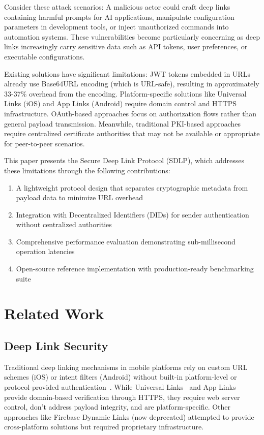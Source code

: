 \documentclass[conference]{IEEEtran}
\begin{document}
Consider these attack scenarios: A malicious actor could craft deep links containing harmful prompts for AI applications, manipulate configuration parameters in development tools, or inject unauthorized commands into automation systems. These vulnerabilities become particularly concerning as deep links increasingly carry sensitive data such as API tokens, user preferences, or executable configurations.

Existing solutions have significant limitations: JWT tokens embedded in URLs already use Base64URL encoding (which is URL-safe), resulting in approximately 33-37\% overhead from the encoding. Platform-specific solutions like Universal Links (iOS) and App Links (Android) require domain control and HTTPS infrastructure. OAuth-based approaches focus on authorization flows rather than general payload transmission. Meanwhile, traditional PKI-based approaches require centralized certificate authorities that may not be available or appropriate for peer-to-peer scenarios.

This paper presents the Secure Deep Link Protocol (SDLP), which addresses these limitations through the following contributions:

\begin{enumerate}
    \item A lightweight protocol design that separates cryptographic metadata from payload data to minimize URL overhead
    \item Integration with Decentralized Identifiers (DIDs) for sender authentication without centralized authorities
    \item Comprehensive performance evaluation demonstrating sub-millisecond operation latencies
    \item Open-source reference implementation with production-ready benchmarking suite
\end{enumerate}

\section{Related Work}

\subsection{Deep Link Security}

Traditional deep linking mechanisms in mobile platforms rely on custom URL schemes (iOS) or intent filters (Android) without built-in platform-level or protocol-provided authentication~\cite{android-intents, ios-url-schemes}. While Universal Links~\cite{ios-universal-links} and App Links~\cite{android-app-links} provide domain-based verification through HTTPS, they require web server control, don't address payload integrity, and are platform-specific. Other approaches like Firebase Dynamic Links (now deprecated) attempted to provide cross-platform solutions but required proprietary infrastructure.
\end{document}
